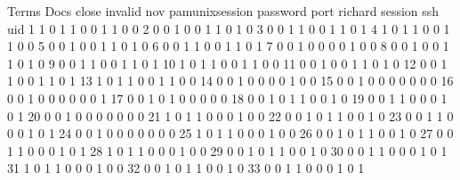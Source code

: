 \documentclass[compress,8pt]{beamer}
\begin{document}
\begin{frame}
\begin{Schunk}
      Terms
Docs   close invalid nov pamunixsession password port richard session ssh uid
  1        1       0   1              1        0    0       1       1   0   0
  2        0       0   1              0        0    1       1       0   1   0
  3        0       0   1              1        0    0       1       1   0   1
  4        1       0   1              1        0    0       1       1   0   0
  5        0       0   1              0        0    1       1       0   1   0
  6        0       0   1              1        0    0       1       1   0   1
  7        0       0   1              0        0    0       0       1   0   0
  8        0       0   1              0        0    1       1       0   1   0
  9        0       0   1              1        0    0       1       1   0   1
  10       1       0   1              1        0    0       1       1   0   0
  11       0       0   1              0        0    1       1       0   1   0
  12       0       0   1              1        0    0       1       1   0   1
  13       1       0   1              1        0    0       1       1   0   0
  14       0       0   1              0        0    0       0       1   0   0
  15       0       0   1              0        0    0       0       0   0   0
  16       0       0   1              0        0    0       0       0   0   1
  17       0       0   1              0        1    0       0       0   0   0
  18       0       0   1              0        1    1       0       0   1   0
  19       0       0   1              1        0    0       0       1   0   1
  20       0       0   1              0        0    0       0       0   0   0
  21       1       0   1              1        0    0       0       1   0   0
  22       0       0   1              0        1    1       0       0   1   0
  23       0       0   1              1        0    0       0       1   0   1
  24       0       0   1              0        0    0       0       0   0   0
  25       1       0   1              1        0    0       0       1   0   0
  26       0       0   1              0        1    1       0       0   1   0
  27       0       0   1              1        0    0       0       1   0   1
  28       1       0   1              1        0    0       0       1   0   0
  29       0       0   1              0        1    1       0       0   1   0
  30       0       0   1              1        0    0       0       1   0   1
  31       1       0   1              1        0    0       0       1   0   0
  32       0       0   1              0        1    1       0       0   1   0
  33       0       0   1              1        0    0       0       1   0   1

\end{Schunk}
\end{frame}
\end{document}
